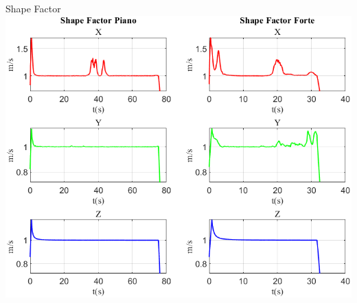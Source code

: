 \documentclass[beamer]{standalone}
\begin{document}
%	
	
	\begin{frame}{{Shape Factor}}
		\centering\includegraphics[height=.8\textheight]{figure/Vel/Shape Factor}
	\end{frame}
	
%	
%	
	
\end{document}
